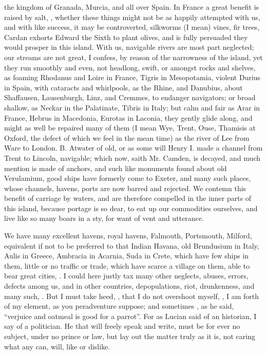 the kingdom of Granada, Murcia, and all over Spain. In France a great benefit
is raised by salt, \etc{}, whether these things might not be as happily
attempted with us, and with like success, it may be controverted, silkworms (I
mean) vines, fir trees, \etc{} Cardan exhorts Edward the Sixth to plant olives,
and is fully persuaded they would prosper in this island. With us, navigable
rivers are most part neglected; our streams are not great, I confess, by reason
of the narrowness of the island, yet they run smoothly and even, not headlong,
swift, or amongst rocks and shelves, as foaming Rhodanus and Loire in France,
Tigris in Mesopotamia, violent Durius in Spain, with cataracts and whirlpools,
as the Rhine, and Danubius, about Shaffausen, Lausenburgh, Linz, and Cremmes,
to endanger navigators; or broad shallow, as Neckar in the Palatinate, Tibris
in Italy; but calm and fair as Arar in France, Hebrus in Macedonia, Eurotas in
Laconia, they gently glide along, and might as well be repaired many of them (I
mean Wye, Trent, Ouse, Thamisis at Oxford, the defect of which we feel in the
mean time) as the river of Lee from Ware to London. B. Atwater of old, or as
some will Henry I. made a channel from Trent to Lincoln,
navigable; which now, saith Mr. Camden, is decayed, and much mention is made of
anchors, and such like monuments found about old
Verulamium, good ships have formerly come to Exeter, and
many such places, whose channels, havens, ports are now barred and rejected. We
contemn this benefit of carriage by waters, and are therefore compelled in the
inner parts of this island, because portage is so dear, to eat up our
commodities ourselves, and live like so many boars in a sty, for want of vent
and utterance.

We have many excellent havens, royal havens, Falmouth, Portsmouth, Milford,
\etc{} equivalent if not to be preferred to that Indian Havana, old Brundusium
in Italy, Aulis in Greece, Ambracia in Acarnia, Suda in Crete, which have few
ships in them, little or no traffic or trade, which have scarce a village on
them, able to bear great cities, . I could here
justly tax many other neglects, abuses, errors, defects among us, and in other
countries, depopulations, riot, drunkenness, \etc{} and many such, . But I must take heed, , that I do not overshoot myself, , I am forth of my
element, as you peradventure suppose; and sometimes ,
as he said, \enquote{verjuice and oatmeal is good for a parrot}. For as Lucian said of
an historian, I say of a politician. He that will freely speak and write, must
be for ever no subject, under no prince or law, but lay out the matter truly as
it is, not caring what any can, will, like or dislike.

